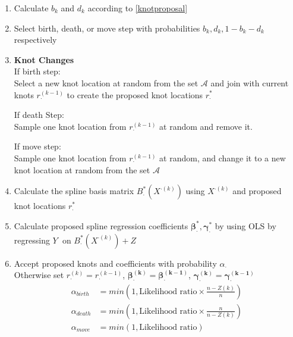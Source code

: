 \documentclass[11pt]{article}\usepackage[]{graphicx}\usepackage[]{color}
\begin{document}
\begin{enumerate}
\item
Calculate $b_k$ and $d_k$ according to \eqref{knotproposal} \\

\item
Select birth, death, or move step with probabilities $b_k,d_k,1-b_k-d_k$ respectively \\

\item
{\bf Knot Changes} \\
If birth step:\\
Select a new knot location at random from the set $\mathcal{A}$ and join with current knots $r_{\cdot}^{(k-1)}$ to create the proposed knot locations $r_{\cdot}^{*}$

If death Step:\\
Sample one knot location from $r_{\cdot}^{(k-1)}$ at random and remove it. 

If move step:\\
Sample one knot location from $r_{\cdot}^{(k-1)}$ at random, and change it to a new knot location at random from the set $\mathcal{A}$


\item
Calculate the spline basis matrix $B^*_{\cdot}(X^{\cdot(k)})$ using $X^{\cdot(k)}$ and proposed knot locations $r_{\cdot}^{*}$

\item
Calculate proposed spline regression coefficients $\boldsymbol{\beta^*_{\cdot}},\boldsymbol{\gamma^*_{\cdot}}$ by using OLS by regressing $Y^{\cdot}$ on $B^*_{\cdot}(X^{\cdot(k)}) + Z$

\item
Accept proposed knots and coefficients with probability $\alpha_{\cdot}$ \\

Otherwise set $r_{\cdot}^{(k)}=r_{\cdot}^{(k-1)}$, $\boldsymbol{\beta^{(k)}_{\cdot}} =\boldsymbol{\beta^{(k-1)}_{\cdot}}$, $\boldsymbol{\gamma^{(k)}_{\cdot}} =\boldsymbol{\gamma^{(k-1)}_{\cdot}}$\\

\begin{align*}
\alpha_{birth} &= min\left(1, \text{Likelihood ratio}\times \frac{n-Z(k)}{n} \right) \\
\alpha_{death} &= min\left(1, \text{Likelihood ratio}\times \frac{n}{n-Z(k)} \right) \\
\alpha_{move} &= min\left(1, \text{Likelihood ratio}\right) 
\end{align*}


\end{enumerate}
\end{document}
